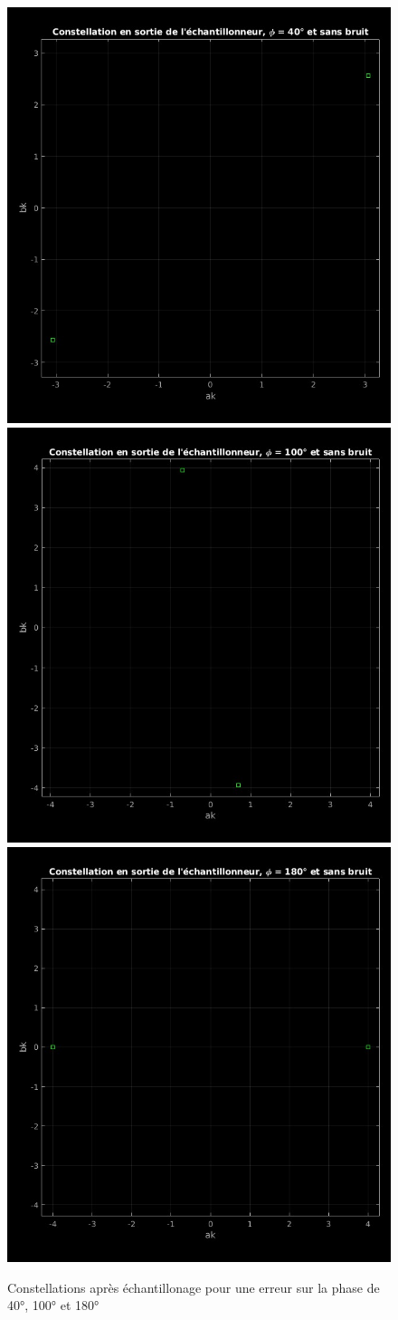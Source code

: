 \documentclass[11pt,a4paper]{report}
\begin{document}
\begin{figure}[H]
    \centering
    \includegraphics[height=5.3 cm]{Screenshots/2_3_1.jpg}
    \includegraphics[height=5.3 cm]{Screenshots/2_3_2.jpg}
    \includegraphics[height=5.3 cm]{Screenshots/2_3_3.jpg}
    \caption{Constellations après échantillonage pour une erreur sur la phase de 40°, 100° et 180°}
    \label{fig:un_label} 
\end{figure}


\begin{table}[H]
        \centering
        \fontsize{12}{20}\selectfont
        \caption{TEB obtenu sans déphasage et sans bruit}
        \label{tableau_power}
\end{table}
\end{document}
